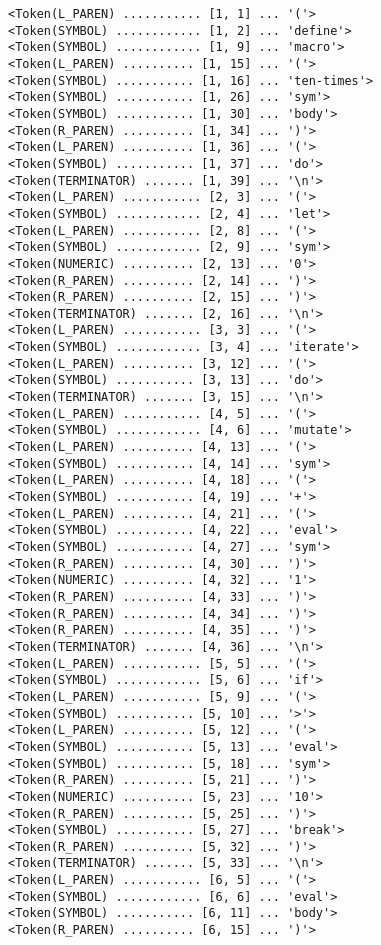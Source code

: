 \documentclass{article}
\begin{document}
      \begin{Verbatim}[baselinestretch=0.75]
<Token(L_PAREN) ........... [1, 1] ... '('>
<Token(SYMBOL) ............ [1, 2] ... 'define'>
<Token(SYMBOL) ............ [1, 9] ... 'macro'>
<Token(L_PAREN) .......... [1, 15] ... '('>
<Token(SYMBOL) ........... [1, 16] ... 'ten-times'>
<Token(SYMBOL) ........... [1, 26] ... 'sym'>
<Token(SYMBOL) ........... [1, 30] ... 'body'>
<Token(R_PAREN) .......... [1, 34] ... ')'>
<Token(L_PAREN) .......... [1, 36] ... '('>
<Token(SYMBOL) ........... [1, 37] ... 'do'>
<Token(TERMINATOR) ....... [1, 39] ... '\n'>
<Token(L_PAREN) ........... [2, 3] ... '('>
<Token(SYMBOL) ............ [2, 4] ... 'let'>
<Token(L_PAREN) ........... [2, 8] ... '('>
<Token(SYMBOL) ............ [2, 9] ... 'sym'>
<Token(NUMERIC) .......... [2, 13] ... '0'>
<Token(R_PAREN) .......... [2, 14] ... ')'>
<Token(R_PAREN) .......... [2, 15] ... ')'>
<Token(TERMINATOR) ....... [2, 16] ... '\n'>
<Token(L_PAREN) ........... [3, 3] ... '('>
<Token(SYMBOL) ............ [3, 4] ... 'iterate'>
<Token(L_PAREN) .......... [3, 12] ... '('>
<Token(SYMBOL) ........... [3, 13] ... 'do'>
<Token(TERMINATOR) ....... [3, 15] ... '\n'>
<Token(L_PAREN) ........... [4, 5] ... '('>
<Token(SYMBOL) ............ [4, 6] ... 'mutate'>
<Token(L_PAREN) .......... [4, 13] ... '('>
<Token(SYMBOL) ........... [4, 14] ... 'sym'>
<Token(L_PAREN) .......... [4, 18] ... '('>
<Token(SYMBOL) ........... [4, 19] ... '+'>
<Token(L_PAREN) .......... [4, 21] ... '('>
<Token(SYMBOL) ........... [4, 22] ... 'eval'>
<Token(SYMBOL) ........... [4, 27] ... 'sym'>
<Token(R_PAREN) .......... [4, 30] ... ')'>
<Token(NUMERIC) .......... [4, 32] ... '1'>
<Token(R_PAREN) .......... [4, 33] ... ')'>
<Token(R_PAREN) .......... [4, 34] ... ')'>
<Token(R_PAREN) .......... [4, 35] ... ')'>
<Token(TERMINATOR) ....... [4, 36] ... '\n'>
<Token(L_PAREN) ........... [5, 5] ... '('>
<Token(SYMBOL) ............ [5, 6] ... 'if'>
<Token(L_PAREN) ........... [5, 9] ... '('>
<Token(SYMBOL) ........... [5, 10] ... '>'>
<Token(L_PAREN) .......... [5, 12] ... '('>
<Token(SYMBOL) ........... [5, 13] ... 'eval'>
<Token(SYMBOL) ........... [5, 18] ... 'sym'>
<Token(R_PAREN) .......... [5, 21] ... ')'>
<Token(NUMERIC) .......... [5, 23] ... '10'>
<Token(R_PAREN) .......... [5, 25] ... ')'>
<Token(SYMBOL) ........... [5, 27] ... 'break'>
<Token(R_PAREN) .......... [5, 32] ... ')'>
<Token(TERMINATOR) ....... [5, 33] ... '\n'>
<Token(L_PAREN) ........... [6, 5] ... '('>
<Token(SYMBOL) ............ [6, 6] ... 'eval'>
<Token(SYMBOL) ........... [6, 11] ... 'body'>
<Token(R_PAREN) .......... [6, 15] ... ')'>

\end{Verbatim}
\end{document}
